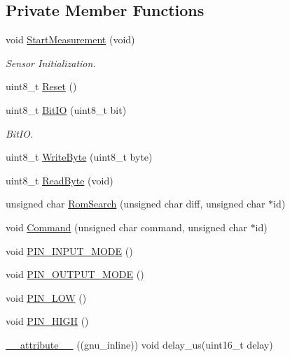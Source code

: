 \subsection*{Private Member Functions}
\begin{DoxyCompactItemize}
\item 
void \hyperlink{classSensors_1_1DS18B20_a038c0caa764736529ebaf28af9ee5321}{Start\+Measurement} (void)
\begin{DoxyCompactList}\small\item\em Sensor Initialization. \end{DoxyCompactList}\item 
uint8\+\_\+t \hyperlink{classSensors_1_1DS18B20_abefe26ccc02fe5b8519d94a6f46729fb}{Reset} ()
\item 
uint8\+\_\+t \hyperlink{classSensors_1_1DS18B20_a56a1466a1d2f1abf713e516e2e6839f8}{Bit\+IO} (uint8\+\_\+t bit)
\begin{DoxyCompactList}\small\item\em Bit\+IO. \end{DoxyCompactList}\item 
uint8\+\_\+t \hyperlink{classSensors_1_1DS18B20_adb4e81dac45643fcee9410be3218c4f9}{Write\+Byte} (uint8\+\_\+t byte)
\item 
uint8\+\_\+t \hyperlink{classSensors_1_1DS18B20_af8ade017aba66c9fa52872c7aa68107f}{Read\+Byte} (void)
\item 
unsigned char \hyperlink{classSensors_1_1DS18B20_a889ad2303c61db988566cbfcfd57a9b9}{Rom\+Search} (unsigned char diff, unsigned char $\ast$id)
\item 
void \hyperlink{classSensors_1_1DS18B20_a14af4e7ba13a59b640d651b3abd3bedb}{Command} (unsigned char command, unsigned char $\ast$id)
\item 
void \hyperlink{classSensors_1_1DS18B20_a8bb87520d8ef3ad3639afab3fbbc39ce}{P\+I\+N\+\_\+\+I\+N\+P\+U\+T\+\_\+\+M\+O\+DE} ()
\item 
void \hyperlink{classSensors_1_1DS18B20_aaf9c80b1de14fc02dd2cfd188eddf751}{P\+I\+N\+\_\+\+O\+U\+T\+P\+U\+T\+\_\+\+M\+O\+DE} ()
\item 
void \hyperlink{classSensors_1_1DS18B20_a3429705d951dec85ffafbc627bcf015f}{P\+I\+N\+\_\+\+L\+OW} ()
\item 
void \hyperlink{classSensors_1_1DS18B20_a1340454609f372341887949ca72e0951}{P\+I\+N\+\_\+\+H\+I\+GH} ()
\item 
\hyperlink{classSensors_1_1DS18B20_a1eab0f2d40228dbf38f00f69b58e0b78}{\+\_\+\+\_\+attribute\+\_\+\+\_\+} ((gnu\+\_\+inline)) void delay\+\_\+us(uint16\+\_\+t delay)
\end{DoxyCompactItemize}

